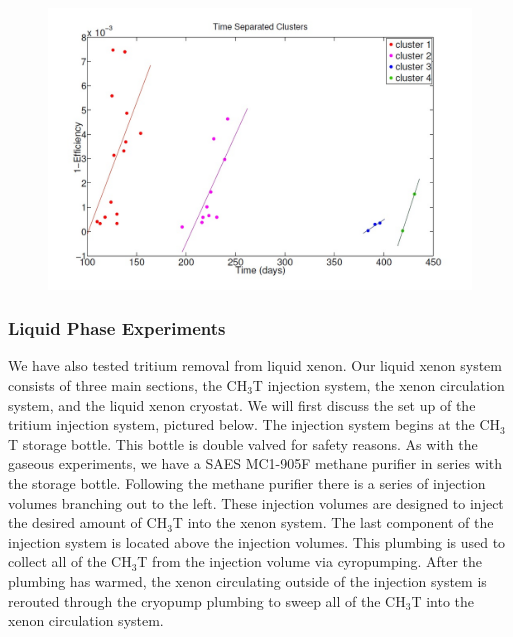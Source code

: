 \documentclass[a4paper,12pt]{article}
\begin{document}
{\begin{figure}
\includegraphics[scale=.4]{GasPhaseRemoval_RestTime.jpg} 
\label{UMDGasRestTime}
\end{figure}



\subsubsection{Liquid Phase Experiments}

We have also tested tritium removal from liquid xenon. Our liquid xenon system
consists of three main sections, the CH$_3$T injection system, the xenon circulation system, and the liquid xenon cryostat. We will first discuss the set up of the tritium injection system, pictured below. The injection system begins at the CH$_3$T storage bottle. This bottle is double valved for safety reasons. As with the gaseous experiments, we have a SAES MC1-905F methane purifier in series with the storage bottle. Following the methane purifier there is a series of injection volumes branching out to the left. These injection volumes are designed to inject the desired amount of CH$_3$T into the xenon system. The last component of the injection system is located above the injection volumes. This plumbing is used to collect all of the CH$_3$T from the injection volume via cyropumping. After the plumbing has warmed, the xenon circulating outside of the injection system is rerouted through the cryopump plumbing to sweep all of the CH$_3$T into the xenon circulation system. 


}
\end{document}
